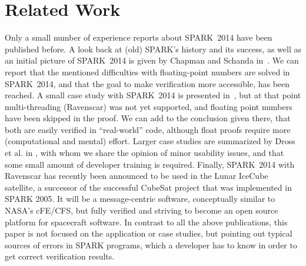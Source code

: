 
\section{Related Work}
\label{sec:related-work}

Only a small number of experience reports about SPARK~2014 have been
published before. A look back at (old) SPARK's history
and its success, as well as an initial picture of SPARK~2014 is given
by Chapman and Schanda in~\cite{Chapman2014}. We can report that the
mentioned difficulties with floating-point numbers are solved in SPARK~2014, 
and that the goal to make verification more accessible, has been reached.  A small case study with SPARK~2014
is presented in~\cite{Trojanek2014}, but at that point multi-threading
(Ravenscar) was not yet supported, and floating point numbers have
been skipped in the proof. We can add to the conclusion given there,
that both are easily verified in ``real-world'' code, although
float proofs require more (computational and mental) effort.  Larger
case studies are summarized by Dross et al. in \cite{Dross2014}, with
whom we share the opinion of minor usability issues, and that some
small amount of developer training is required.  Finally, SPARK~2014
with Ravenscar has recently been announced to be used in the Lunar
IceCube~\cite{Brandon2016} satellite, a successor of the successful CubeSat project that was implemented in SPARK 2005. It will be a message-centric software, conceptually similar to NASA's cFE/CFS, but 
fully verified and striving to become an open source platform for spacecraft software.
In contrast to all the above publications, this paper is not focused on the application or case studies, but  pointing out typical sources of errors in SPARK programs, which a developer has to
know in order to get correct verification results.

